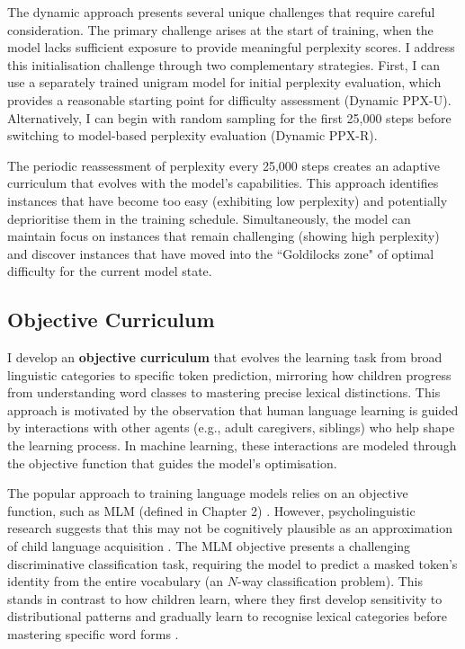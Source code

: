 \begin{enumerate}
The dynamic approach presents several unique challenges that require careful consideration. The primary challenge arises at the start of training, when the model lacks sufficient exposure to provide meaningful perplexity scores. I address this initialisation challenge through two complementary strategies. First, I can use a separately trained unigram model for initial perplexity evaluation, which provides a reasonable starting point for difficulty assessment (Dynamic PPX-U). Alternatively, I can begin with random sampling for the first 25,000 steps before switching to model-based perplexity evaluation (Dynamic PPX-R).

The periodic reassessment of perplexity every 25,000 steps creates an adaptive curriculum that evolves with the model's capabilities. This approach identifies instances that have become too easy (exhibiting low perplexity) and potentially deprioritise them in the training schedule. Simultaneously, the model can maintain focus on instances that remain challenging (showing high perplexity) and discover instances that have moved into the ``Goldilocks zone" of optimal difficulty for the current model state.

\end{enumerate}

\subsection{Objective Curriculum}
\label{subsec:objective-cl}

I develop an \textbf{objective curriculum} that evolves the learning task from broad linguistic categories to specific token prediction, mirroring how children progress from understanding word classes to mastering precise lexical distinctions. This approach is motivated by the observation that human language learning is guided by interactions with other agents (e.g., adult caregivers, siblings) who help shape the learning process. In machine learning, these interactions are modeled through the objective function that guides the model's optimisation.

The popular approach to training language models relies on an objective function, such as MLM (defined in Chapter 2) \citep{devlin2019bert}. However, psycholinguistic research suggests that this may not be cognitively plausible as an approximation of child language acquisition \citep{caucheteux2023evidence}. The MLM objective presents a challenging discriminative classification task, requiring the model to predict a masked token's identity from the entire vocabulary (an $N$-way classification problem). This stands in contrast to how children learn, where they first develop sensitivity to distributional patterns and gradually learn to recognise lexical categories before mastering specific word forms \citep{alishahi2010computational, gleitman1990structural}.

